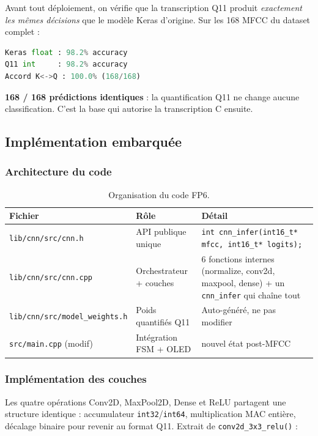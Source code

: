 Avant tout déploiement, on vérifie que la transcription Q11 produit \emph{exactement les mêmes décisions} que le modèle Keras d'origine. Sur les 168 MFCC du dataset complet :

\begin{lstlisting}[language=Python, caption={Sortie de \texttt{scripts/cnn\_inference\_q11.py}}]
Keras float : 98.2% accuracy
Q11 int     : 98.2% accuracy
Accord K<->Q : 100.0% (168/168)
\end{lstlisting}

\noindent\textbf{168 / 168 prédictions identiques} : la quantification Q11 ne change aucune classification. C'est la base qui autorise la transcription C ensuite.

\subsection{Implémentation embarquée}

\subsubsection{Architecture du code}

\begin{table}[H]
\centering
\small
\begin{tabularx}{0.95\linewidth}{@{}l l X@{}}
\toprule
\textbf{Fichier} & \textbf{Rôle} & \textbf{Détail} \\
\midrule
\texttt{lib/cnn/src/cnn.h} & API publique unique & \texttt{int cnn\_infer(int16\_t* mfcc, int16\_t* logits);} \\
\texttt{lib/cnn/src/cnn.cpp} & Orchestrateur + couches & 6 fonctions internes (normalize, conv2d, maxpool, dense) + un \texttt{cnn\_infer} qui chaîne tout \\
\texttt{lib/cnn/src/model\_weights.h} & Poids quantifiés Q11 & Auto-généré, ne pas modifier \\
\texttt{src/main.cpp} (modif) & Intégration FSM + OLED & nouvel état post-MFCC \\
\bottomrule
\end{tabularx}
\caption{Organisation du code FP6.}
\end{table}

\subsubsection{Implémentation des couches}

Les quatre opérations Conv2D, MaxPool2D, Dense et ReLU partagent une structure identique : accumulateur \texttt{int32}/\texttt{int64}, multiplication MAC entière, décalage binaire pour revenir au format Q11. Extrait de \texttt{conv2d\_3x3\_relu()} :

